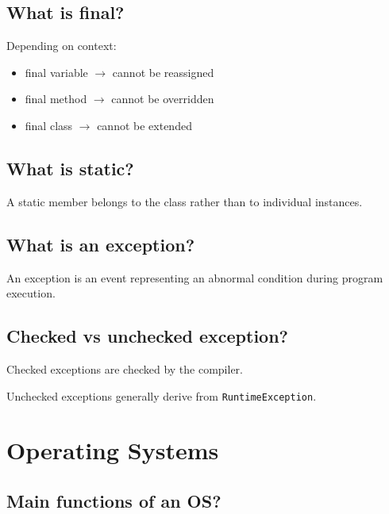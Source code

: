 \medskip

\subsection{What is final?}

Depending on context:

\begin{itemize}
  \item final variable $\rightarrow$ cannot be reassigned
  \item final method $\rightarrow$ cannot be overridden
  \item final class $\rightarrow$ cannot be extended
\end{itemize}

\medskip

\subsection{What is static?}

A static member belongs to the class rather than to individual instances.

\medskip

\subsection{What is an exception?}

An exception is an event representing an abnormal condition during program execution.

\medskip

\subsection{Checked vs unchecked exception?}

Checked exceptions are checked by the compiler.

Unchecked exceptions generally derive from \texttt{RuntimeException}.

\medskip

\section{Operating Systems}

\subsection{Main functions of an OS?}

